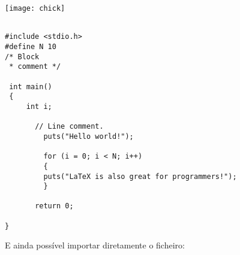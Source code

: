 \texttt{[image: chick]}



\begin{verbatim}

#include <stdio.h>
#define N 10
/* Block
 * comment */

 int main()
 {
     int i;
	 
	   // Line comment.
		 puts("Hello world!");
			     
		 for (i = 0; i < N; i++)
		 {
		 puts("LaTeX is also great for programmers!");
		 }
							 
	   return 0;
				
}
\end{verbatim}


E ainda possível importar diretamente o ficheiro:





